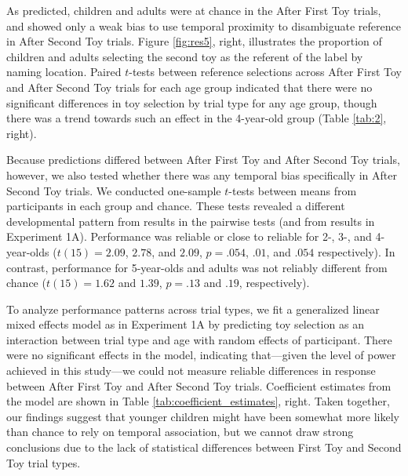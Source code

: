 \documentclass[man]{apa2}
\begin{document}
As predicted, children and adults were at chance in the After First Toy trials, and showed only a weak bias to use temporal proximity to disambiguate reference in After Second Toy trials. Figure \ref{fig:res5}, right, illustrates the proportion of children and adults selecting the second toy as the referent of the label by naming location.  Paired $t$-tests between reference selections across After First Toy and After Second Toy trials for each age group indicated that there were no significant differences in toy selection by trial type for any age group, though there was a trend towards such an effect in the 4-year-old group (Table \ref{tab:2}, right). 






Because predictions differed between After First Toy and After Second Toy trials, however, we also tested whether there was any temporal bias specifically in After Second Toy trials. We conducted one-sample $t$-tests between means from participants in each group and chance. These tests revealed a different developmental pattern from results in the pairwise tests (and from results in Experiment 1A). Performance was reliable or close to reliable for 2-, 3-, and 4-year-olds ($t(15) = 2.09$, $2.78$, and $2.09$, $p = .054$, $.01$, and $.054$ respectively). In contrast, performance for 5-year-olds and adults was not reliably different from chance ($t(15) = 1.62$ and $1.39$, $p = .13$ and $.19$, respectively). 

To analyze performance patterns across trial types, we fit a generalized linear mixed effects model as in Experiment 1A by predicting toy selection as an interaction between trial type and age with random effects of participant.  There were no significant effects in the model, indicating that---given the level of power achieved in this study---we could not measure reliable differences in response between After First Toy and After Second Toy trials. Coefficient estimates from the model are shown in Table \ref{tab:coefficient_estimates}, right. Taken together, our findings suggest that younger children might have been somewhat more likely than chance to rely on temporal association, but we cannot draw strong conclusions due to the lack of statistical differences between First Toy and Second Toy trial types. 
\end{document}
